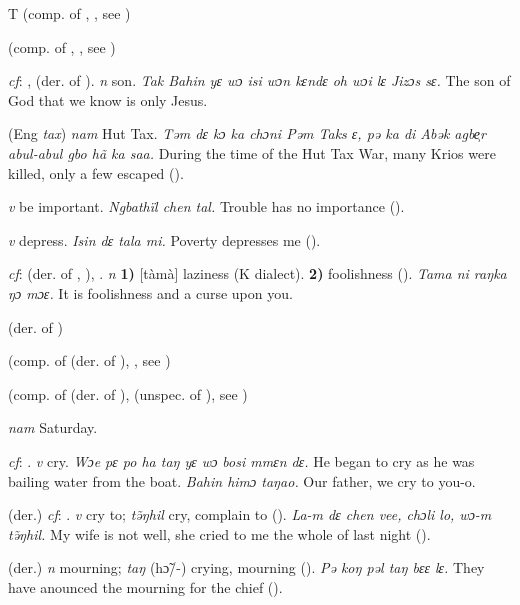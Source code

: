 \begin{letter}{T}
 (comp. of , , see ) 

 (comp. of , , see ) 

 \textit{cf}: ,  (der. of ). \textit{n} son. \textit{Tak Bahin yɛ wɔ isi wɔn kɛndɛ oh wɔi lɛ Jizɔs sɛ.} The son of God that we know is only Jesus.

 (Eng \textit{tax}) \textit{nam} Hut Tax. \textit{Təm dɛ kɔ ka chɔni Pəm Taks ɛ, pə ka di Abək agbe̹r abul-abul gbo hã ka saa.} During the time of the Hut Tax War, many Krios were killed, only a few escaped (\citealt{Pichl1967}). 

 \textit{v} be important. \textit{Ngbathïl chen tal.} Trouble has no importance (\citealt{Pichl1967}). 

 \textit{v} depress. \textit{Isin dɛ tala mi.} Poverty depresses me (\citealt{Pichl1967}). 

 \textit{cf}:  (der. of , ), . \textit{n} \textbf{1)} [tàmà] laziness (K dialect). \textbf{2)} foolishness (\citealt{Pichl1967}). \textit{Tama ni raŋka ŋɔ mɔɛ.} It is foolishness and a curse upon you.

 (der. of ) 

 (comp. of  (der. of ), , see ) 

 (comp. of  (der. of ),  (unspec. of ), see ) 

 \textit{nam} Saturday.

 \textit{cf}: . \textit{v} cry. \textit{Wɔe pɛ po ha taŋ yɛ wɔ bosi mmɛn dɛ.} He began to cry as he was bailing water from the boat. \textit{Bahin himɔ taŋao.} Our father, we cry to you-o.

 (der.) \textit{cf}: . \textit{v} cry to; \textit{tə̃ŋhil} cry, complain to (\citealt{Pichl1967}). \textit{La-m dɛ chen vee, chɔli lo, wɔ-m tə̃ŋhil.} My wife is not well, she cried to me the whole of last night (\citealt{Pichl1967}). 

 (der.) \textit{n} mourning; \textit{taŋ} (hɔ̃/-) crying, mourning (\citealt{Pichl1967}). \textit{Pə koŋ pəl taŋ bɛɛ lɛ.} They have anounced the mourning for the chief (\citealt{Pichl1967}). 


\end{letter}
